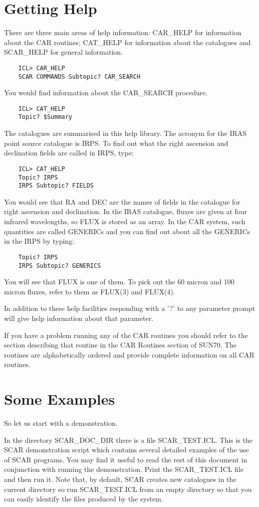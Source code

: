 \section {Getting Help}
There are three main areas of help information: CAR\_HELP for information 
about the CAR routines; CAT\_HELP for information about the catalogues and 
SCAR\_HELP for general information.
\begin{verbatim}
    ICL> CAR_HELP
    SCAR COMMANDS Subtopic? CAR_SEARCH
\end{verbatim}
You would find information about the CAR\_SEARCH procedure.
\begin{verbatim}
    ICL> CAT_HELP
    Topic? $Summary
\end{verbatim}
The catalogues are summarised in this help library.
The acronym for the IRAS point source catalogue is IRPS.
To find out what the right ascension and declination fields are called in IRPS,
type:
\begin{verbatim}
    ICL> CAT_HELP
    Topic? IRPS
    IRPS Subtopic? FIELDS
\end{verbatim}
You would see that RA and DEC are the names of fields in the catalogue for right
ascension and declination.
In the IRAS catalogue, fluxes are given at four infrared wavelengths, so FLUX is
stored as an array. 
In the CAR system, such quantities are called GENERICs and you can find out
about all the GENERICs in the IRPS by typing:
\begin{verbatim}
    Topic? IRPS
    IRPS Subtopic? GENERICS
\end{verbatim}
You will see that FLUX is one of them.
To pick out the 60 micron and 100 micron fluxes, refer to them as FLUX(3) and
FLUX(4).

In addition to these help facilities responding with a '?' to any parameter
prompt will give help information about that parameter.

If you have a problem running any of the CAR routines you should refer to the
section describing that routine in the CAR Routines section of SUN70. The 
routines are alphabetically ordered and provide complete information on all 
CAR routines.
 
\section {Some Examples}

So let us start with a demonstration.

In the directory SCAR\_DOC\_DIR there is a file SCAR\_TEST.ICL.
This is the SCAR demonstration script which contains several detailed 
examples of the use of SCAR programs. You may find it useful to read the 
rest of this document in conjunction with running the demonstration.
Print the SCAR\_TEST.ICL file and then run it. 
Note that, by default, SCAR creates new catalogues in the current directory so 
run SCAR\_TEST.ICL from an empty directory so that you can easily identify the 
files produced by the system.
 
